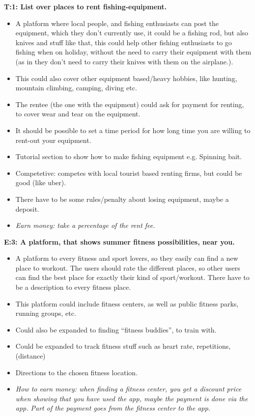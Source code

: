 \begin{multicols}{2}
\footnotesize{
{\noindent \textbf{T:1: List over places to rent fishing-equipment.}}
\begin{itemize}
	\item A platform where local people, and fishing enthusiasts can post the equipment, which they don’t currently use, it could be a fishing rod, but also knives and stuff like that, this could help other fishing enthusiasts to go fishing when on holiday, without the need to carry their equipment with them (as in they don’t need to carry their knives with them on the airplane.). 
	\item This could also cover other equipment based/heavy hobbies, like hunting, mountain climbing, camping, diving etc.
	\item The rentee (the one with the equipment) could ask for payment for renting, to cover wear and tear on the equipment.
	\item It should be possible to set a time period for how long time you are willing to rent-out your equipment. 
	\item Tutorial section to show how to make fishing equipment e.g. Spinning bait.
	\item Competetive: competes with local tourist based renting firms, but could be good (like uber).
	\item There have to be some rules/penalty about losing equipment, maybe a deposit.
	\item \textit{Earn money: take a percentage of the rent fee. }
\end{itemize}
{\noindent \textbf{E:3: A platform, that shows summer fitness possibilities, near you.}}
\begin{itemize}
	\item A platform to every fitness and sport lovers, so they easily can find a new place to workout. The users should rate the different places, so other users can find the best place for exactly their kind of sport/workout. There have to be a description to every fitness place.  
	\item This platform could include fitness centers, as well as public fitness parks, running groups, etc.
	\item Could also be expanded to finding “fitness buddies”, to train with.
	\item Could be expanded to track fitness stuff such as heart rate, repetitions, (distance) 
	\item Directions to the chosen fitness location.
	\item \textit{How to earn money:  when finding a fitness center, you get a discount price when showing that you have used the app, maybe the payment is done via the app. Part of the payment goes from the fitness center to the app.
}
\end{itemize}}
\end{multicols}
